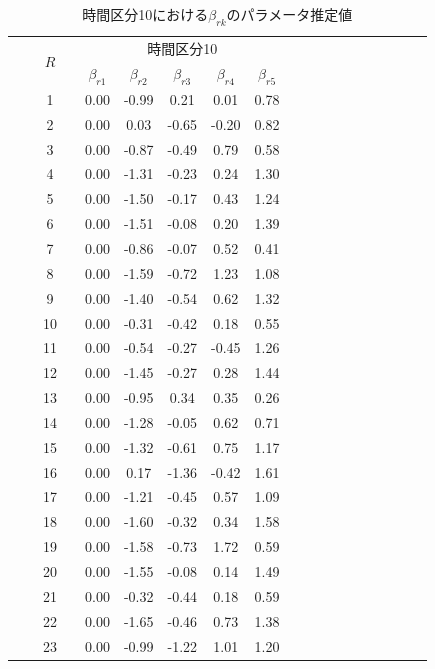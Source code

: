 \documentclass[a4paper,11pt,oneside,openany]{jsbook}
\newcommand{\bhline}[1]{\noalign{\hrule height #1}}
\begin{document}
\begin{table}[h!]
\begin{center}
\caption{時間区分10における$\beta_{rk}$のパラメータ推定値}
\setlength{\tabcolsep}{5.pt}
\begin{tabular}{ccccccccccccccccccc}  
\bhline{1pt}
& & \multirow{2}{*}{$R$} & & \multicolumn{5}{c}{時間区分10}\\
\cline{5-9} 
  & &  &  & $\beta_{r1}$ & $\beta_{r2}$ & $\beta_{r3}$ & $\beta_{r4}$ & $\beta_{r5}$ \\
\bhline{1pt}
 &  & 1  &  & 0.00 & -0.99 & 0.21  & 0.01  & 0.78 \\
 &  & 2  &  & 0.00 & 0.03  & -0.65 & -0.20 & 0.82 \\
 &  & 3  &  & 0.00 & -0.87 & -0.49 & 0.79  & 0.58 \\
 &  & 4  &  & 0.00 & -1.31 & -0.23 & 0.24  & 1.30 \\
 &  & 5  &  & 0.00 & -1.50 & -0.17 & 0.43  & 1.24 \\
 &  & 6  &  & 0.00 & -1.51 & -0.08 & 0.20  & 1.39 \\
 &  & 7  &  & 0.00 & -0.86 & -0.07 & 0.52  & 0.41 \\
 &  & 8  &  & 0.00 & -1.59 & -0.72 & 1.23  & 1.08 \\
 &  & 9  &  & 0.00 & -1.40 & -0.54 & 0.62  & 1.32 \\
 &  & 10 &  & 0.00 & -0.31 & -0.42 & 0.18  & 0.55 \\
 &  & 11 &  & 0.00 & -0.54 & -0.27 & -0.45 & 1.26 \\
 &  & 12 &  & 0.00 & -1.45 & -0.27 & 0.28  & 1.44 \\
 &  & 13 &  & 0.00 & -0.95 & 0.34  & 0.35  & 0.26 \\
 &  & 14 &  & 0.00 & -1.28 & -0.05 & 0.62  & 0.71 \\
 &  & 15 &  & 0.00 & -1.32 & -0.61 & 0.75  & 1.17 \\
 &  & 16 &  & 0.00 & 0.17  & -1.36 & -0.42 & 1.61 \\
 &  & 17 &  & 0.00 & -1.21 & -0.45 & 0.57  & 1.09 \\
 &  & 18 &  & 0.00 & -1.60 & -0.32 & 0.34  & 1.58 \\
 &  & 19 &  & 0.00 & -1.58 & -0.73 & 1.72  & 0.59 \\
 &  & 20 &  & 0.00 & -1.55 & -0.08 & 0.14  & 1.49 \\
 &  & 21 &  & 0.00 & -0.32 & -0.44 & 0.18  & 0.59 \\
 &  & 22 &  & 0.00 & -1.65 & -0.46 & 0.73  & 1.38 \\
 &  & 23 &  & 0.00 & -0.99 & -1.22 & 1.01  & 1.20 \\

\end{tabular}
\end{center}
\end{table}
\end{document}
